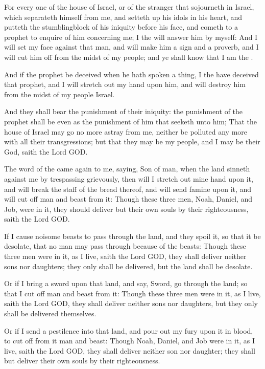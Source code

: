 \verse For every one of the house of Israel, or of the stranger that sojourneth in Israel, which separateth himself from me, and setteth up his idols in his heart, and putteth the stumblingblock of his iniquity before his face, and cometh to a prophet to enquire of him concerning me; I the \LORD will answer him by myself: \verse And I will set my face against that man, and will make him a sign and a proverb, and I will cut him off from the midst of my people; and ye shall know that I am the \LORD.

\verse And if the prophet be deceived when he hath spoken a thing, I the \LORD have deceived that prophet, and I will stretch out my hand upon him, and will destroy him from the midst of my people Israel.

\verse And they shall bear the punishment of their iniquity: the punishment of the prophet shall be even as the punishment of him that seeketh unto him; \verse That the house of Israel may go no more astray from me, neither be polluted any more with all their transgressions; but that they may be my people, and I may be their God, saith the Lord GOD.

\verse The word of the \LORD came again to me, saying, \verse Son of man, when the land sinneth against me by trespassing grievously, then will I stretch out mine hand upon it, and will break the staff of the bread thereof, and will send famine upon it, and will cut off man and beast from it: \verse Though these three men, Noah, Daniel, and Job, were in it, they should deliver but their own souls by their righteousness, saith the Lord GOD.

\verse If I cause noisome beasts to pass through the land, and they spoil it, so that it be desolate, that no man may pass through because of the beasts: \verse Though these three men were in it, as I live, saith the Lord GOD, they shall deliver neither sons nor daughters; they only shall be delivered, but the land shall be desolate.

\verse Or if I bring a sword upon that land, and say, Sword, go through the land; so that I cut off man and beast from it: \verse Though these three men were in it, as I live, saith the Lord GOD, they shall deliver neither sons nor daughters, but they only shall be delivered themselves.

\verse Or if I send a pestilence into that land, and pour out my fury upon it in blood, to cut off from it man and beast: \verse Though Noah, Daniel, and Job were in it, as I live, saith the Lord GOD, they shall deliver neither son nor daughter; they shall but deliver their own souls by their righteousness.


